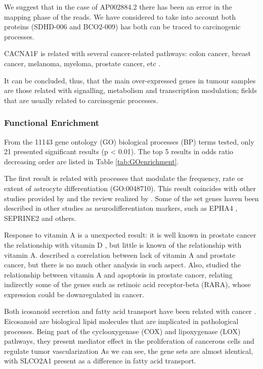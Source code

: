 \documentclass[9pt,twocolumn,twoside]{gsajnl}
\begin{document}
We suggest that in the case of AP002884.2 there has been an error in the mapping phase of the reads. We have considered to take into account both proteins (SDHD-006 and BCO2-009) has both can be traced to carcinogenic processes.

CACNA1F is related with several cancer-related pathways: colon cancer, breast cancer, melanoma, myeloma, prostate cancer, etc \cite{tcng}.

It can be concluded, thus, that the main over-expressed genes in tumour samples are those related with signalling, metabolism and transcription modulation; fields that are usually related to carcinogenic processes.

\subsubsection*{Functional Enrichment}

From the 11143 gene ontology (GO) biological processes (BP) terms tested, only 21 presented significant results (p < 0.01). The top 5 results in odds ratio decreasing order are listed in Table \ref{tab:GOenrichment}.

The first result is related with processes that modulate the frequency, rate or extent of astrocyte differentiation (GO:0048710). This result coincides with other studies provided by \cite{neuroendocrine3, neuroendocrine2} and the review realized by \cite{neuroendocrine1}. Some of the set genes haven been described in other studies as neurodifferentiaton markers, such as EPHA4 \cite{neuroendocrine_EPA}, SEPRINE2 \cite{mckee2013protease} and others.

Response to vitamin A is a unexpected result: it is well known in prostate cancer the relationship with vitamin D \citep{vitamin0,vitamind1,vitamind2,vitamind3}, but little is known of the relationship with vitamin A. \cite{vitamina1} described a correlation between lack of vitamin A and prostate cancer, but there is no much other analysis in such aspect. Also, \cite{vitamina2} studied the relationship between vitamin A and apoptosis in prostate cancer, relating indirectly some of the genes such as retinoic acid receptor-beta (RARA), whose expression could be downregulated in cancer.

Both icosanoid secretion and fatty acid transport have been related with cancer \citep{fat1,fat2}. Eicosanoid are biological lipid molecules that are implicated in pathological processes. Being part of the  cyclooxygenase (COX) and lipoxygenase (LOX) pathways, they present mediator effect in the proliferation of cancerous cells and regulate tumor vascularization \citep{fatvascu} As we can see, the gene sets are almost identical, with SLCO2A1 present as a difference in fatty acid transport.
\end{document}
